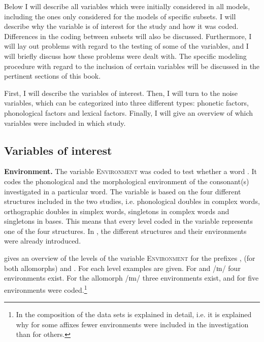 Below I will describe all variables which were initially considered in all models, including the ones only considered for the models of specific subsets. I will describe why the variable is of interest for the study and how it was coded. Differences in the coding between subsets will also be discussed. Furthermore, I will lay out  problems with regard to the testing of some of the variables, and I will briefly discuss how these problems were dealt with. The specific modeling procedure with regard to the inclusion of certain variables will be discussed in the pertinent sections of this book.


First, I will describe the variables of interest. Then, I will turn to the noise variables, which can be categorized  into three different types: phonetic factors, phonological factors and lexical factors.  Finally, I will give an overview of which variables were included in which study. 

\subsection{Variables of interest} \label{variables of interest}

\textbf{Environment.}  The variable \textsc{Environment} was coded to test whether a word . It codes the phonological and the morphological environment of the consonant(s) investigated in a particular word. The variable is based on the four different structures included in the two studies,  i.e. phonological doubles in complex words, orthographic doubles in simplex words, singletons in complex words and singletons in bases. This means that every level coded in the variable represents one of the four structures. In , the different structures and their environments were already introduced. %
 
  gives an overview of the levels of the variable \textsc{Environment} for the prefixes ,   (for both allomorphs) and . For each level examples are given.
 For  and /ɪn/ four environments exist. For the allomorph /ɪm/ three environments exist, and for  five environments were coded.\footnote{In  the composition of the data sets is explained in detail, i.e. it is explained why for some affixes fewer environments were included in the investigation than for others.}
 

